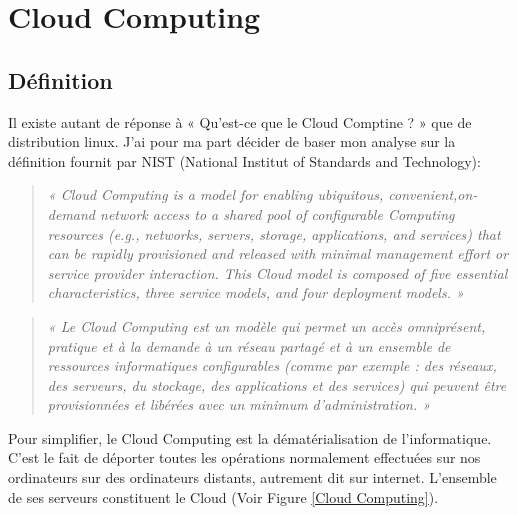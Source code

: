 \chapter{Cloud Computing} \label{CloudComputingAnnexe}

  \section{Définition}
  Il existe autant de réponse à « Qu’est-ce que le Cloud Comptine ? » que de distribution linux. J’ai pour ma part décider de baser mon analyse sur la définition fournit par NIST (National Institut of Standards and Technology):\\

  \begin{quotation}
    \emph{« Cloud Computing is a model for enabling ubiquitous, convenient,on-demand network access to a shared pool of configurable Computing resources (e.g., networks, servers, storage, applications, and services) that can be rapidly provisioned and released with minimal management effort or service provider interaction. This Cloud model is composed of five essential characteristics, three service models, and four deployment models. »}
  \end{quotation}

  \begin{quotation}
    \emph{« Le Cloud Computing est un modèle qui permet un accès omniprésent, pratique et à la demande à un réseau partagé et à un ensemble de ressources informatiques configurables (comme par exemple : des réseaux, des serveurs, du stockage, des applications et des services) qui peuvent être provisionnées et libérées avec un minimum d’administration. »}\\
  \end{quotation}

  Pour simplifier, le Cloud Computing est la dématérialisation de l’informatique. C’est le fait de déporter toutes les opérations normalement effectuées sur nos ordinateurs sur des ordinateurs distants, autrement dit sur internet. L’ensemble de ses serveurs constituent le Cloud (Voir Figure \ref{Cloud Computing}).

